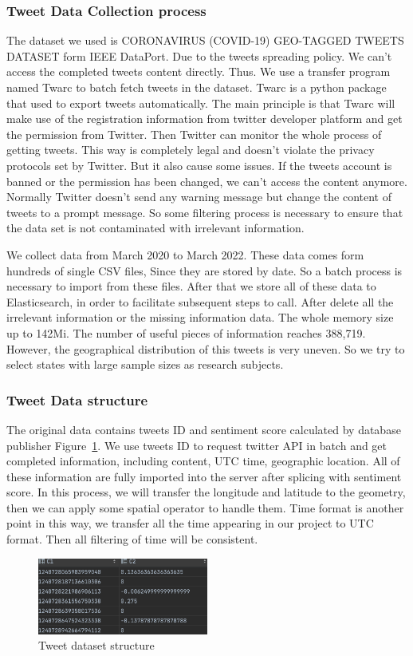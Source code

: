 \subsubsection{Tweet Data Collection process}
The dataset we used is CORONAVIRUS (COVID-19) GEO-TAGGED TWEETS DATASET form
IEEE DataPort. Due to the tweets spreading policy. We can't access the
completed tweets content directly.  Thus. We use a transfer program named
Twarc to batch fetch tweets in the dataset. Twarc is a python package
that used to export tweets automatically.  The main principle is that Twarc
will make use of the registration information from twitter developer platform
and get the permission from Twitter. Then Twitter can monitor the whole
process of getting tweets. This way is completely legal and doesn't violate
the privacy protocols set by Twitter. But it also cause some issues. If the
tweets account is banned or the permission has been changed, we can't access
the content anymore. Normally Twitter doesn't send any warning message but
change the content of tweets to a prompt message. So some filtering process
is necessary to ensure that the data set is not contaminated with irrelevant
information. 

We collect data from March 2020 to March 2022. These data comes form hundreds
of single CSV files, Since they are stored by date. So a batch process is
necessary to import from these files. After that we store all of these data
to Elasticsearch, in order to facilitate subsequent steps to call. After
delete all the irrelevant information or the missing information data. The
whole memory size up to 142Mi. The number of useful pieces of information
reaches 388,719. However, the geographical distribution of this tweets is
very uneven. So we try to select states with large sample sizes as research
subjects. 

\subsubsection{Tweet Data structure}
The original data contains tweets ID and sentiment score calculated by
database publisher Figure~\ref{fig:Tweet dataset}. We use tweets ID to
request twitter API in batch and get completed information, including
content, UTC time, geographic location. All of these information are fully
imported into the server after splicing with sentiment score.  In this
process, we will transfer the longitude and latitude to the geometry, then we
can apply some spatial operator to handle them. Time format is another point
in this way, we transfer all the time appearing in our project to UTC format.
Then all filtering of time will be consistent. 
\begin{figure}[h]
\centering
\includegraphics[width=0.5\textwidth]{imgs/row_tweets.png}
\caption{Tweet dataset structure}
\label{fig:Tweet dataset}
\end{figure}
